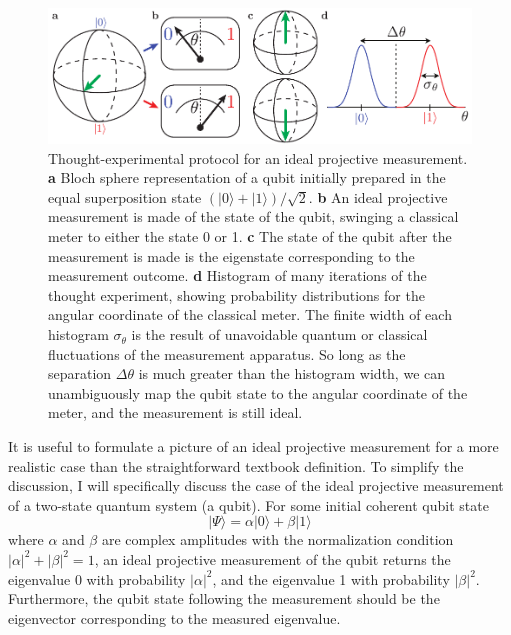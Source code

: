 \begin{figure}
\begin{center}
	\includegraphics[width = 6.5in]{qmeas_chapter/ideal_proj_meas}
\end{center}
\caption[Ideal projective measurement]{Thought-experimental protocol for an ideal projective measurement. \textbf{a} Bloch sphere representation of a qubit initially prepared in the equal superposition state $(|0\rangle + |1\rangle)/\sqrt{2}$. \textbf{b} An ideal projective measurement is made of the state of the qubit, swinging a classical meter to either the state 0 or 1. \textbf{c} The state of the qubit after the measurement is made is the eigenstate corresponding to the measurement outcome.  \textbf{d} Histogram of many iterations of the thought experiment, showing probability distributions for the angular coordinate of the classical meter.  The finite width of each histogram $\sigma_\theta$ is the result of unavoidable quantum or classical fluctuations of the measurement apparatus.  So long as the separation $\Delta \theta$ is much greater than the histogram width, we can unambiguously map the qubit state to the angular coordinate of the meter, and the measurement is still ideal.}
\label{fig:ideal_proj_meas}
\end{figure}

It is useful to formulate a picture of an ideal projective measurement for a more realistic case than the straightforward textbook definition.  To simplify the discussion, I will specifically discuss the case of the ideal projective measurement of a two-state quantum system (a qubit).  For some initial coherent qubit state
\begin{equation}
|\Psi\rangle = \alpha |0\rangle + \beta |1\rangle
\label{eq:qubit_psi}
\end{equation}
where $\alpha$ and $\beta$ are complex amplitudes with the normalization condition $|\alpha|^2 + |\beta|^2 = 1$, an ideal projective measurement of the qubit returns the eigenvalue 0 with probability $|\alpha|^2$, and the eigenvalue 1 with probability $|\beta|^2$.  Furthermore, the qubit state following the measurement should be the eigenvector corresponding to the measured eigenvalue.

